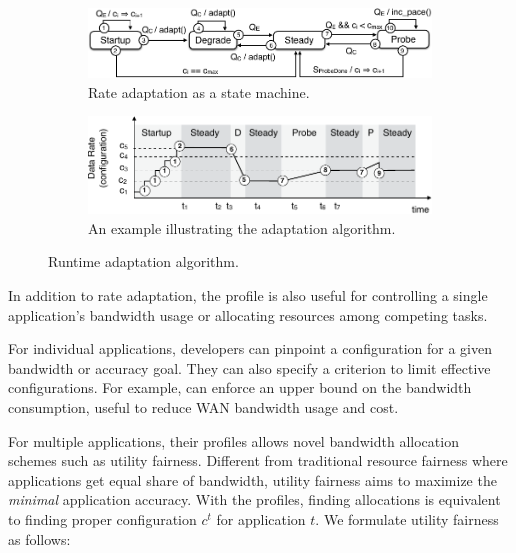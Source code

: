 \begin{figure}
  \begin{subfigure}[t]{\columnwidth}
    \centering
    \includegraphics[width=\columnwidth]{figures/cc.pdf}
    \caption{Rate adaptation as a state machine.}
    \vspace{1em}
    \label{fig:cc-sm}
  \end{subfigure}
  \begin{subfigure}[t]{\columnwidth}
    \centering
    \includegraphics[width=\columnwidth]{figures/cc2.pdf}
    \caption{An example illustrating the adaptation algorithm.}
    \label{fig:cc-ex}
  \end{subfigure}
  \caption{Runtime adaptation algorithm.}
  \label{fig:cc}
\end{figure}

%     

 In addition to rate adaptation, the
profile is also useful for controlling a single application's bandwidth usage or allocating resources among competing tasks.

For individual applications, developers can pinpoint a configuration for a given
bandwidth or accuracy goal. They can also specify a criterion to limit effective
configurations. For example, \sysname{} can enforce an upper bound on the
bandwidth consumption, useful to reduce WAN bandwidth usage and cost.

For multiple applications, their profiles allows novel bandwidth allocation
schemes such as utility fairness. Different from traditional resource fairness
where applications get equal share of bandwidth, utility fairness aims
to maximize the \textit{minimal} application accuracy. With the profiles,
finding allocations is equivalent to finding proper configuration $c^t$ for
application $t$. We formulate utility fairness as follows:

